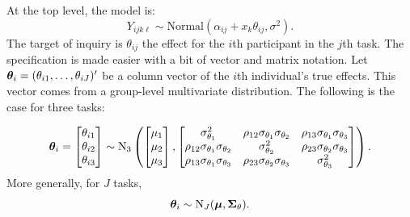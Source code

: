 \documentclass[
  english,
  ,man]{apa6}
\begin{document}
At the top level, the model is:
\[
Y_{ijk\ell} \sim \mbox{Normal}(\alpha_{ij}+x_k\theta_{ij},\sigma^2).
\]
The target of inquiry is \(\theta_{ij}\) the effect for the \(i\)th participant in the \(j\)th task. The specification is made easier with a bit of vector and matrix notation. Let \(\bm \theta_{i}=(\theta_{i1},\ldots,\theta_{iJ})'\) be a column vector of the \(i\)th individual's true effects. This vector comes from a group-level multivariate distribution. The following is the case for three tasks:

\[
\bm \theta_i=\begin{bmatrix} \theta_{i1}\\ \theta_{i2} \\ \theta_{i3}\end{bmatrix} 
\sim \mbox{N}_3 \left( \begin{bmatrix} \mu_1\\\mu_2\\\mu_3\end{bmatrix},
\begin{bmatrix}
\sigma^2_{\theta_1} & \rho_{12}\sigma_{\theta_1}\sigma_{\theta_2} & \rho_{13}\sigma_{\theta_1}\sigma_{\theta_3}\\
\rho_{12}\sigma_{\theta_1}\sigma_{\theta_2} & \sigma_{\theta_2}^2 & \rho_{23}\sigma_{\theta_2}\sigma_{\theta_3}\\
\rho_{13}\sigma_{\theta_1}\sigma_{\theta_3} & \rho_{23}\sigma_{\theta_2}\sigma_{\theta_3} & \sigma_{\theta_3}^2\\
\end{bmatrix}
\right).
\]
More generally, for \(J\) tasks,
\begin{equation}
\label{eq:Sig}
\bm \theta_i \sim \mbox{N}_J(\bm \mu,\bm \Sigma_\theta).
\end{equation}
\end{document}

